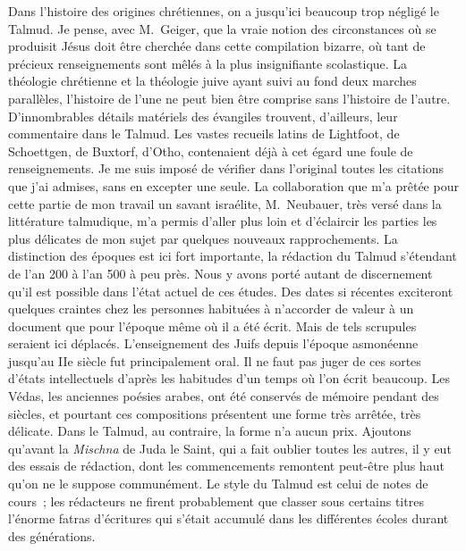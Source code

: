 \documentclass[french,twoside]{book} %
\begin{document}
Dans l’histoire des origines chrétiennes, on a jusqu’ici beaucoup trop négligé le Talmud. Je pense, avec M. Geiger, que la vraie notion des circonstances où se produisit Jésus doit être cherchée dans cette compilation bizarre, où tant de précieux renseignements sont mêlés à la plus insignifiante scolastique. La théologie chrétienne et la théologie juive ayant suivi au fond deux marches parallèles, l’histoire de l’une ne peut bien être comprise sans l’histoire de l’autre. D’innombrables détails matériels des évangiles trouvent, d’ailleurs, leur commentaire dans le Talmud. Les vastes recueils latins de Lightfoot, de Schoettgen, de Buxtorf, d’Otho, contenaient déjà à cet égard une foule de renseignements. Je me suis imposé de vérifier dans l’original toutes les citations que j’ai admises, sans en excepter une seule. La collaboration que m’a prêtée pour cette partie de mon travail un savant israélite, M. Neubauer, très versé dans la littérature talmudique, m’a permis d’aller plus loin et d’éclaircir les parties les plus délicates de mon sujet par quelques nouveaux rapprochements. La distinction des époques est ici fort importante, la rédaction du Talmud s’étendant de l’an 200 à l’an 500 à peu près. Nous y avons porté autant de discernement qu’il est possible dans l’état actuel de ces études. Des dates si récentes exciteront quelques craintes chez les personnes habituées à n’accorder de valeur à un document que pour l’époque même où il a été écrit. Mais de tels scrupules seraient ici déplacés. L’enseignement des Juifs depuis l’époque asmonéenne jusqu’au IIe siècle fut principalement oral. Il ne faut pas juger de ces sortes d’états intellectuels d’après les habitudes d’un temps où l’on écrit beaucoup. Les Védas, les anciennes poésies arabes, ont été conservés de mémoire pendant des siècles, et pourtant ces compositions présentent une forme très arrêtée, très délicate. Dans le Talmud, au contraire, la forme n’a aucun prix. Ajoutons qu’avant la {\itshape Mischna} de Juda le Saint, qui a fait oublier toutes les autres, il y eut des essais de rédaction, dont les commencements remontent peut-être plus haut qu’on ne le suppose communément. Le style du Talmud est celui de notes de cours ; les rédacteurs ne firent probablement que classer sous certains titres l’énorme fatras d’écritures qui s’était accumulé dans les différentes écoles durant des générations.\par
\end{document}
